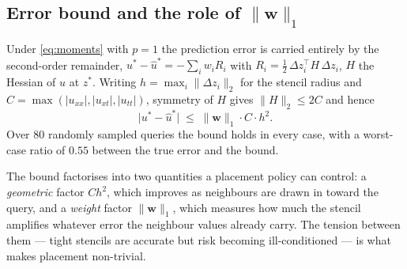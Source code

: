 \subsection{Error bound and the role of \texorpdfstring{$\|\mathbf{w}\|_1$}{the weight norm}}
\label{sec:recon_bound}

Under \eqref{eq:moments} with $p = 1$ the prediction error is carried entirely
by the second-order remainder, $u^{*} - \hat{u}^{*} = -\sum_i w_i R_i$ with
$R_i = \tfrac12\,\Delta z_i^{\top} H\,\Delta z_i$, $H$ the Hessian of $u$ at
$z^{*}$. Writing $h = \max_i \|\Delta z_i\|_2$ for the stencil radius and
$C = \max(|u_{xx}|,|u_{xt}|,|u_{tt}|)$, symmetry of $H$ gives
$\|H\|_2 \le 2C$ and hence
%
\begin{equation}
  \bigl|u^{*} - \hat{u}^{*}\bigr|
  \;\le\;
  \|\mathbf{w}\|_1 \cdot C \cdot h^{2}.
  \label{eq:error_bound}
\end{equation}
%
Over $80$ randomly sampled queries the bound holds in every case, with a
worst-case ratio of $0.55$ between the true error and the bound.

The bound factorises into two quantities a placement policy can control: a
\emph{geometric} factor $Ch^{2}$, which improves as neighbours are drawn in
toward the query, and a \emph{weight} factor $\|\mathbf{w}\|_1$, which measures
how much the stencil amplifies whatever error the neighbour values already
carry. The tension between them --- tight stencils are accurate but risk
becoming ill-conditioned --- is what makes placement non-trivial.

